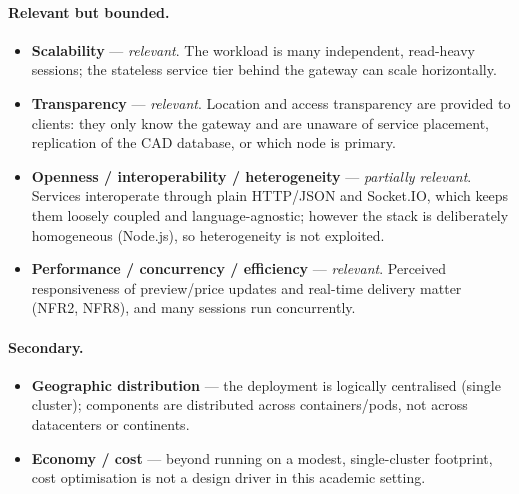 \paragraph{Relevant but bounded.}
\begin{itemize}
  \item \textbf{Scalability} --- \emph{relevant}. The workload is many
  independent, read-heavy sessions; the stateless service tier behind the
  gateway can scale horizontally. 

  \item \textbf{Transparency} --- \emph{relevant}. Location and access
  transparency are provided to clients: they only know the gateway and are
  unaware of service placement, replication of the CAD database, or which node
  is primary. 
  \item \textbf{Openness / interoperability / heterogeneity} --- \emph{partially
  relevant}. Services interoperate through plain HTTP/JSON and Socket.IO, which
  keeps them loosely coupled and language-agnostic; however the stack is
  deliberately homogeneous (Node.js), so heterogeneity is not exploited.

  \item \textbf{Performance / concurrency / efficiency} --- \emph{relevant}.
  Perceived responsiveness of preview/price updates and real-time delivery
  matter (NFR2, NFR8), and many sessions run concurrently.
\end{itemize}

\paragraph{Secondary.}
\begin{itemize}
  \item \textbf{Geographic distribution} --- the deployment is logically
  centralised (single cluster); components are distributed across
  containers/pods, not across datacenters or continents.

  \item \textbf{Economy / cost} --- beyond running on a modest, single-cluster
  footprint, cost optimisation is not a design driver in this academic setting.
\end{itemize}
